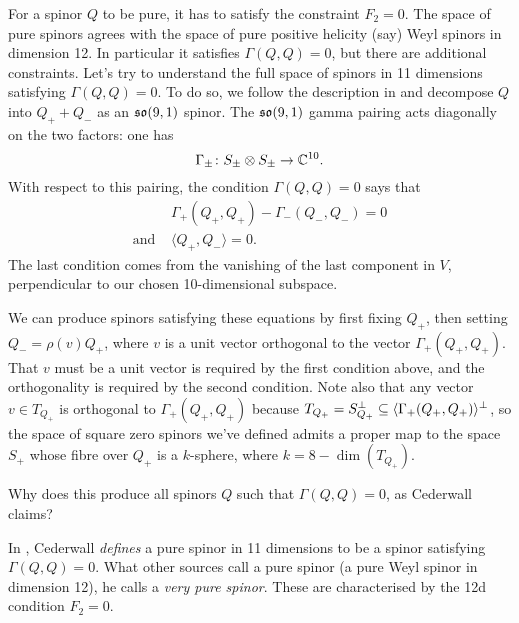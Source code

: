\documentclass[10pt, oneside]{article}
\begin{document}
\begin{itemize}
For a spinor $Q$ to be pure, it has to satisfy the constraint $F_2 = 0$.  The space of pure spinors agrees with the space of pure positive helicity (say) Weyl spinors in dimension 12. In particular it satisfies $\Gamma(Q,Q) = 0$, but there are additional constraints.  Let's try to understand the full space of spinors in 11 dimensions satisfying $\Gamma(Q,Q) = 0$.  To do so, we follow the description in \cite{Cederwall1} and decompose $Q$ into $Q_+ + Q_-$ as an $\mathfrak{so}(9,1)$ spinor.  The $\mathfrak{so}(9,1)$ gamma pairing acts diagonally on the two factors: one has
\[\Gamma_\pm \colon S_\pm \otimes S_\pm \to \mathbb{C}^{10}.\]
With respect to this pairing, the condition $\Gamma(Q,Q)=0$ says that
\begin{align*}
&\Gamma_+(Q_+, Q_+) - \Gamma_-(Q_-, Q_-) = 0 \\
\text{and } &\langle Q_+, Q_-\rangle = 0.
\end{align*}
The last condition comes from the vanishing of the last component in $V$, perpendicular to our chosen 10-dimensional subspace. 

We can produce spinors satisfying these equations by first fixing $Q_+$, then setting $Q_- = \rho(v)Q_+$, where $v$ is a unit vector orthogonal to the vector $\Gamma_+(Q_+, Q_+)$.  That $v$ must be a unit vector is required by the first condition above, and the orthogonality is required by the second condition.  Note also that any vector $v \in T_{Q_+}$ is orthogonal to $\Gamma_+(Q_+,Q_+)$ because $T_{Q_+} = S_{Q_+}^\perp \subseteq \langle \Gamma_+(Q_+,Q_+)\rangle^\perp$, so the space of square zero spinors we've defined admits a proper map to the space $S_+$ whose fibre over $Q_+$ is a $k$-sphere, where $k = 8 - \dim(T_{Q_+})$.

\begin{question}
Why does this produce all spinors $Q$ such that $\Gamma(Q,Q) = 0$, as Cederwall claims?
\end{question}

\begin{remark}
In \cite{Cederwall1}, Cederwall \emph{defines} a pure spinor in 11 dimensions to be a spinor satisfying $\Gamma(Q,Q)=0$.  What other sources call a pure spinor (a pure Weyl spinor in dimension 12), he calls a \emph{very pure spinor}.  These are characterised by the 12d condition $F_2 = 0$.
\end{remark}

\end{itemize}
\end{document}
